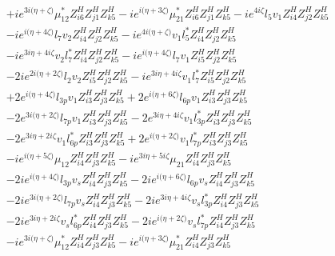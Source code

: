 \begin{align}
 &+i e^{3 i \Big(\eta +\zeta \Big)} \mu_{12}^* Z_{{i 6}}^{H} Z_{{j 1}}^{H} Z_{{k 5}}^{H} -i e^{i \Big(\eta +3 \zeta \Big)} \mu_{21}^* Z_{{i 6}}^{H} Z_{{j 1}}^{H} Z_{{k 5}}^{H} -i e^{4 i \zeta } l_5 v_1 Z_{{i 4}}^{H} Z_{{j 2}}^{H} Z_{{k 5}}^{H} \nonumber \\ 
 &-i e^{i \Big(\eta +4 \zeta \Big)} l_7 v_2 Z_{{i 4}}^{H} Z_{{j 2}}^{H} Z_{{k 5}}^{H} -i e^{4 i \Big(\eta +\zeta \Big)} v_1 l_5^* Z_{{i 4}}^{H} Z_{{j 2}}^{H} Z_{{k 5}}^{H} \nonumber \\ 
 &-i e^{3 i \eta +4 i \zeta } v_2 l_7^* Z_{{i 4}}^{H} Z_{{j 2}}^{H} Z_{{k 5}}^{H} -i e^{i \Big(\eta +4 \zeta \Big)} l_7 v_1 Z_{{i 5}}^{H} Z_{{j 2}}^{H} Z_{{k 5}}^{H} \nonumber \\ 
 &-2 i e^{2 i \Big(\eta +2 \zeta \Big)} l_2 v_2 Z_{{i 5}}^{H} Z_{{j 2}}^{H} Z_{{k 5}}^{H} -i e^{3 i \eta +4 i \zeta } v_1 l_7^* Z_{{i 5}}^{H} Z_{{j 2}}^{H} Z_{{k 5}}^{H} \nonumber \\ 
 &+2 e^{i \Big(\eta +4 \zeta \Big)} l_{3p} v_1 Z_{{i 3}}^{H} Z_{{j 3}}^{H} Z_{{k 5}}^{H} +2 e^{i \Big(\eta +6 \zeta \Big)} l_{6p} v_1 Z_{{i 3}}^{H} Z_{{j 3}}^{H} Z_{{k 5}}^{H} \nonumber \\ 
 &-2 e^{3 i \Big(\eta +2 \zeta \Big)} l_{7p} v_1 Z_{{i 3}}^{H} Z_{{j 3}}^{H} Z_{{k 5}}^{H} -2 e^{3 i \eta +4 i \zeta } v_1 l_{3p}^* Z_{{i 3}}^{H} Z_{{j 3}}^{H} Z_{{k 5}}^{H} \nonumber \\ 
 &-2 e^{3 i \eta +2 i \zeta } v_1 l_{6p}^* Z_{{i 3}}^{H} Z_{{j 3}}^{H} Z_{{k 5}}^{H} +2 e^{i \Big(\eta +2 \zeta \Big)} v_1 l_{7p}^* Z_{{i 3}}^{H} Z_{{j 3}}^{H} Z_{{k 5}}^{H} \nonumber \\ 
 &-i e^{i \Big(\eta +5 \zeta \Big)} \mu_{12} Z_{{i 4}}^{H} Z_{{j 3}}^{H} Z_{{k 5}}^{H} -i e^{3 i \eta +5 i \zeta } \mu_{21} Z_{{i 4}}^{H} Z_{{j 3}}^{H} Z_{{k 5}}^{H} \nonumber \\ 
 &-2 i e^{i \Big(\eta +4 \zeta \Big)} l_{3p} v_s Z_{{i 4}}^{H} Z_{{j 3}}^{H} Z_{{k 5}}^{H} -2 i e^{i \Big(\eta +6 \zeta \Big)} l_{6p} v_s Z_{{i 4}}^{H} Z_{{j 3}}^{H} Z_{{k 5}}^{H} \nonumber \\ 
 &-2 i e^{3 i \Big(\eta +2 \zeta \Big)} l_{7p} v_s Z_{{i 4}}^{H} Z_{{j 3}}^{H} Z_{{k 5}}^{H} -2 i e^{3 i \eta +4 i \zeta } v_s l_{3p}^* Z_{{i 4}}^{H} Z_{{j 3}}^{H} Z_{{k 5}}^{H} \nonumber \\ 
 &-2 i e^{3 i \eta +2 i \zeta } v_s l_{6p}^* Z_{{i 4}}^{H} Z_{{j 3}}^{H} Z_{{k 5}}^{H} -2 i e^{i \Big(\eta +2 \zeta \Big)} v_s l_{7p}^* Z_{{i 4}}^{H} Z_{{j 3}}^{H} Z_{{k 5}}^{H} \nonumber \\ 
 &-i e^{3 i \Big(\eta +\zeta \Big)} \mu_{12}^* Z_{{i 4}}^{H} Z_{{j 3}}^{H} Z_{{k 5}}^{H} -i e^{i \Big(\eta +3 \zeta \Big)} \mu_{21}^* Z_{{i 4}}^{H} Z_{{j 3}}^{H} Z_{{k 5}}^{H} \nonumber \\ 

\end{align}
